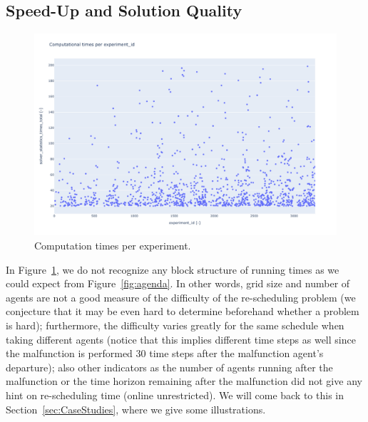 \documentclass{article}
\begin{document}
\subsection{Speed-Up and Solution Quality}

\begin{figure}[hbtp]
    \includegraphics[width=\textwidth]{Figures/04_computational_results/times_total_per_experiment_id.pdf}
	\caption{Computation times per experiment.}
	\label{fig:computationtimesexperimentid}
\end{figure}
In Figure~\ref{fig:computationtimesexperimentid}, we do not recognize any block structure of running times as we could expect from Figure~\ref{fig:agenda}. In other words, grid size and number of agents are not a good measure of the difficulty of the re-scheduling problem (we conjecture that it may be even hard to determine beforehand whether a problem is hard); furthermore, the difficulty varies greatly for the same schedule when taking different agents (notice that this implies different time steps as well since the malfunction is performed 30 time steps after the malfunction agent's departure); also other indicators as the number of agents running after the malfunction or the time horizon remaining after the malfunction did not give any hint on re-scheduling time (online unrestricted). We will come back to this in Section~\ref{sec:CaseStudies}, where we give some illustrations.
\end{document}
